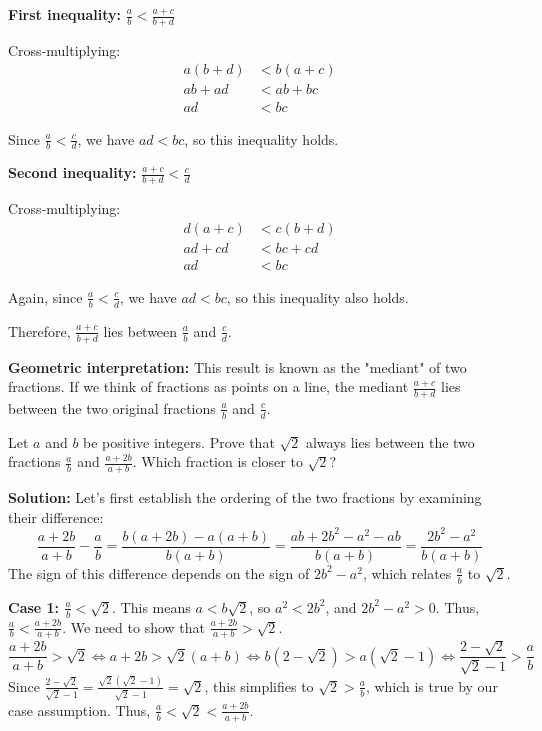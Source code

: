 \textbf{First inequality:} $\frac{a}{b} < \frac{a + c}{b + d}$

Cross-multiplying:
\begin{align*}
a(b + d) &< b(a + c) \\
ab + ad &< ab + bc \\
ad &< bc
\end{align*}

Since $\frac{a}{b} < \frac{c}{d}$, we have $ad < bc$, so this inequality holds.

\textbf{Second inequality:} $\frac{a + c}{b + d} < \frac{c}{d}$

Cross-multiplying:
\begin{align*}
d(a + c) &< c(b + d) \\
ad + cd &< bc + cd \\
ad &< bc
\end{align*}

Again, since $\frac{a}{b} < \frac{c}{d}$, we have $ad < bc$, so this inequality also holds.

Therefore, $\frac{a + c}{b + d}$ lies between $\frac{a}{b}$ and $\frac{c}{d}$.

\textbf{Geometric interpretation:}
This result is known as the "mediant" of two fractions. If we think of fractions as points on a line, the mediant $\frac{a + c}{b + d}$ lies between the two original fractions $\frac{a}{b}$ and $\frac{c}{d}$.

\begin{problembox}
Let $a$ and $b$ be positive integers. Prove that $\sqrt{2}$ always lies between the two fractions $\frac{a}{b}$ and $\frac{a + 2b}{a + b}$. Which fraction is closer to $\sqrt{2}$?
\end{problembox}

\textbf{Solution:}
Let's first establish the ordering of the two fractions by examining their difference:
\[
\frac{a + 2b}{a + b} - \frac{a}{b} = \frac{b(a + 2b) - a(a + b)}{b(a + b)} = \frac{ab + 2b^2 - a^2 - ab}{b(a + b)} = \frac{2b^2 - a^2}{b(a + b)}
\]
The sign of this difference depends on the sign of $2b^2 - a^2$, which relates $\frac{a}{b}$ to $\sqrt{2}$.

\textbf{Case 1: $\frac{a}{b} < \sqrt{2}$}. This means $a < b\sqrt{2}$, so $a^2 < 2b^2$, and $2b^2 - a^2 > 0$.
Thus, $\frac{a}{b} < \frac{a+2b}{a+b}$. We need to show that $\frac{a+2b}{a+b} > \sqrt{2}$.
\[
\frac{a + 2b}{a + b} > \sqrt{2} \iff a + 2b > \sqrt{2}(a + b) \iff b(2 - \sqrt{2}) > a(\sqrt{2} - 1) \iff \frac{2 - \sqrt{2}}{\sqrt{2} - 1} > \frac{a}{b}
\]
Since $\frac{2 - \sqrt{2}}{\sqrt{2} - 1} = \frac{\sqrt{2}(\sqrt{2} - 1)}{\sqrt{2} - 1} = \sqrt{2}$, this simplifies to $\sqrt{2} > \frac{a}{b}$, which is true by our case assumption. Thus, $\frac{a}{b} < \sqrt{2} < \frac{a + 2b}{a + b}$.

